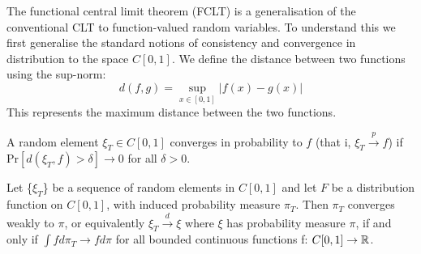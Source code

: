 \documentclass[DIV=14,titlepage=false]{scrreprt}
\begin{document}
The functional central limit theorem (FCLT) is a generalisation of the conventional CLT to function-valued random variables. To understand this we first generalise the standard notions of consistency and convergence in distribution to the space $C[0,1]$. We define the distance between two functions using the sup-norm:
\[
    d(f,g) = \sup_{x \in [0,1]} |f(x) - g(x)|
\]
This represents the maximum distance between the two functions.\\
\begin{definition}
    A random element $\xi_T \in C[0,1]$ converges in probability to $f$ (that i, $\xi_T \xrightarrow{p} f$) if Pr$[d(\xi_T, f) > \delta] \to 0$ for all $\delta > 0$.
\end{definition}

\begin{definition}
Let \{$\xi_T$\} be a sequence of random elements in $C[0,1]$ and let $F$ be a distribution function on $C[0,1]$, with induced probability measure $\pi_T$. Then $\pi_T$ converges weakly to $\pi$, or equivalently $\xi_T \xrightarrow{d} \xi$ where $\xi$ has probability measure $\pi$, if and only if $\int f d \pi_T \to f d \pi$ for all bounded continuous functions f: $C[0,1] \to \mathbb{R}$.
\end{definition}
\end{document}

